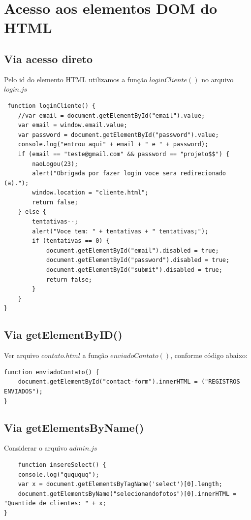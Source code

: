 \section{Acesso aos elementos DOM do HTML }
\subsection{Via acesso direto}

 Pelo id do elemento HTML utilizamos a função $loginCliente()$ no arquivo $login.js$
 \begin{lstlisting}
 function loginCliente() {
    //var email = document.getElementById("email").value;
    var email = window.email.value;
    var password = document.getElementById("password").value;
    console.log("entrou aqui" + email + " e " + password);
    if (email == "teste@gmail.com" && password == "projeto$$") {
        naoLogou(23);
        alert("Obrigada por fazer login voce sera redirecionado (a).");
        window.location = "cliente.html";
        return false;
    } else {
        tentativas--;
        alert("Voce tem: " + tentativas + " tentativas;");
        if (tentativas == 0) {
            document.getElementById("email").disabled = true;
            document.getElementById("password").disabled = true;
            document.getElementById("submit").disabled = true;
            return false;
        }
    }
}
 \end{lstlisting}

\subsection{Via getElementByID()}
	Ver arquivo $contato.html$ a função $enviadoContato()$, conforme código abaixo:
	
\begin{lstlisting}
function enviadoContato() {
    document.getElementById("contact-form").innerHTML = ("REGISTROS ENVIADOS");
}
\end{lstlisting}

\subsection{Via getElementsByName()}

	Considerar o arquivo $admin.js$
\begin{lstlisting}
	function insereSelect() {
    console.log("quququq");
    var x = document.getElementsByTagName('select')[0].length;
    document.getElementsByName("selecionandofotos")[0].innerHTML = "Quantide de clientes: " + x;
}
\end{lstlisting}

